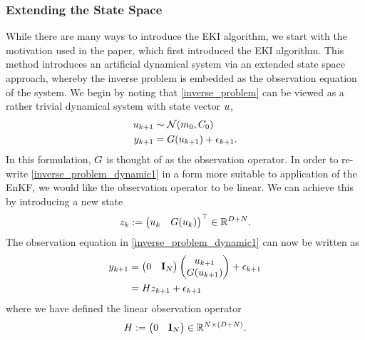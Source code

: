 \documentclass[12pt]{article}
\begin{document}
\subsubsection{Extending the State Space}
While there are many ways to introduce the EKI algorithm, we start with the motivation used in the paper, which first introduced 
the EKI algorithm. This method introduces an artificial dynamical system via an extended state space approach, whereby the 
inverse problem is embedded as the observation equation of the system. We begin 
by noting that \ref{inverse_problem} can be viewed as a rather trivial dynamical system with state vector $\spar$,
\begin{align}
\dpar[\timeStep+1] &\sim \Gaussian(\priorMean, \priorCov) \label{inverse_problem_dynamic1} \\
\indexTimeStep[\timeStep+1]{\dataObs} &= \fwd(\dpar[\timeStep+1]) + \indexTimeStep[\timeStep+1]{\noise}. \nonumber
\end{align}
In this formulation, $\fwd$ is thought of as the observation operator. In order to re-write \ref{inverse_problem_dynamic1}
in a form more suitable to application of the EnKF, we would like the observation operator to be linear. We can achieve this
by introducing a new state
\begin{align}
\dexState := \begin{pmatrix} \dpar & \fwd(\dpar) \end{pmatrix}^\top \in \R^{\Npar + \dimData}.
\end{align}
The observation equation in \ref{inverse_problem_dynamic1} can now be written as 
\begin{align*}
\indexTimeStep[\timeStep+1]{\dataObs} 
&= \begin{pmatrix} 0 & \idMat_{\dimData} \end{pmatrix} \begin{pmatrix} \dpar[\timeStep+1] \\ \fwd(\dpar[\timeStep+1]) \end{pmatrix} + \indexTimeStep[\timeStep+1]{\noise} \\
&= \obsOpLin \dexState[\timeStep+1] + \indexTimeStep[\timeStep+1]{\noise} 
\end{align*}
where we have defined the linear observation operator 
\begin{align}
\obsOpLin := \begin{pmatrix} 0 & \idMat_{\dimData} \end{pmatrix} \in \R^{\dimData \times (\Npar + \dimData)}.
\end{align}
\end{document}
